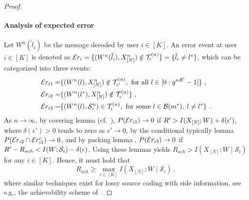 \documentclass[conference, letterpaper]{IEEEtran} %
\begin{document}
\begin{proof}
\paragraph{Analysis of expected error}
Let $W^{n}(\hat{l}_i)$ be the message decoded by user $i\in[K]$. An error event at user $i\in[K]$ is denoted as $\mathcal{E}r_{i}=\{(W^{n}({\hat{l}_i}), X_{[N]}^{n})\notin \mathcal{T}_{\epsilon}^{(n)}\}=\{\hat{l}_i\ne l^*\}$, which can be categorized into three events:
\begin{align}
    \err_{i1}=&\{(W^{n}(l), X_{[N]}^{n})\notin \mathcal{T}_{\epsilon'}^{(n)}, \text{ for all } l \in [0:q^{n\Rcomp}-1] \} \ ,\nonumber\\
    \err_{i2}=&\{(W^n(l^*), X_{[N]}^{n}%
    )\notin \mathcal{T}_{\epsilon}^{(n)}\} \ , \nonumber\\
    \err_{i3}=&\{(W^{n}(l), \mathcal{S}_{i}^{n})\in \mathcal{T}_{\epsilon}^{(n)}, \text{ for some } 
    l\in \mathcal{B}(m^*), \:l\ne l^* \} \ .\nonumber
\end{align}
As $n\to\infty$, by covering lemma (cf.~\cite[Lemma~3.3]{el2011network}), $P(\mathcal{E}r_{i1})\to 0$ if $R'> I(X_{[N]}; W)+\delta(\epsilon')$, where $\delta(\epsilon')>0$ tends to zero as $\epsilon'\to 0$, by the conditional typically lemma~\cite[Section~2.5]{el2011network} $P(\mathcal{E}r_{i2} \cap \mathcal{E}r_{i1}^c)\to 0$, and  by packing lemma \cite[Lemma~3.1]{el2011network}, $P(\mathcal{E}r_{i3})\to 0$ if $R'-R_{ach}< I(W;\mathcal{S}_{i})-\delta(\epsilon)$. Using these lemmas yields  $R_{ach}>I(X_{[N]};W\mid \mathcal{S}_{i})$ for any $i\in[K]$. Hence, it must hold that
\begin{equation}
\label{eq:rate_condition}
    R_{ach}\geq \max_{i \in [K]} I(X_{[N]};W\mid \mathcal{S}_{i})\ ,
\end{equation}
where similar techniques exist for lossy source coding with side information, see e.g., the achievability scheme of~\cite{heegard1985rate}.






\end{proof}
\end{document}
